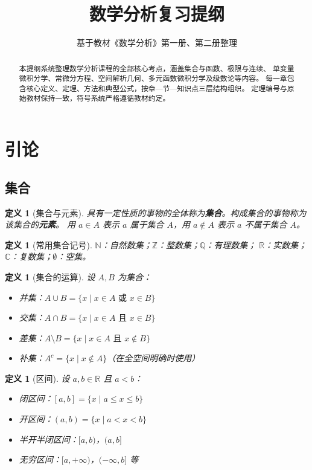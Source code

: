 \documentclass[12pt,a4paper]{ctexart}
\title{数学分析复习提纲}
\author{基于教材《数学分析》第一册、第二册整理}
\date{}
\newtheorem{definition}[theorem]{定义}
\theoremstyle{remark}
\begin{document}
\maketitle

\begin{abstract}
本提纲系统整理数学分析课程的全部核心考点，涵盖集合与函数、极限与连续、
单变量微积分学、常微分方程、空间解析几何、多元函数微积分学及级数论等内容。
每一章包含核心定义、定理、方法和典型公式，按章—节—知识点三层结构组织。
定理编号与原始教材保持一致，符号系统严格遵循教材约定。
\end{abstract}

\tableofcontents

\section{引论}

\subsection{集合}

\begin{definition}[集合与元素]
具有一定性质的事物的全体称为\textbf{集合}。构成集合的事物称为该集合的\textbf{元素}。
用 $a \in A$ 表示 $a$ 属于集合 $A$，用 $a \notin A$ 表示 $a$ 不属于集合 $A$。
\end{definition}

\begin{definition}[常用集合记号]
$\mathbb{N}$：自然数集；$\mathbb{Z}$：整数集；$\mathbb{Q}$：有理数集；
$\mathbb{R}$：实数集；$\mathbb{C}$：复数集；$\emptyset$：空集。
\end{definition}

\begin{definition}[集合的运算]
设 $A,B$ 为集合：
\begin{itemize}
  \item 并集：$A \cup B = \{x \mid x \in A \text{ 或 } x \in B\}$
  \item 交集：$A \cap B = \{x \mid x \in A \text{ 且 } x \in B\}$
  \item 差集：$A \setminus B = \{x \mid x \in A \text{ 且 } x \notin B\}$
  \item 补集：$A^c = \{x \mid x \notin A\}$（在全空间明确时使用）
\end{itemize}
\end{definition}

\begin{definition}[区间]
设 $a,b \in \mathbb{R}$ 且 $a < b$：
\begin{itemize}
  \item 闭区间：$[a,b] = \{x \mid a \le x \le b\}$
  \item 开区间：$(a,b) = \{x \mid a < x < b\}$
  \item 半开半闭区间：$[a,b)$，$(a,b]$
  \item 无穷区间：$[a,+\infty)$，$(-\infty,b]$ 等
\end{itemize}
\end{definition}
\end{document}
